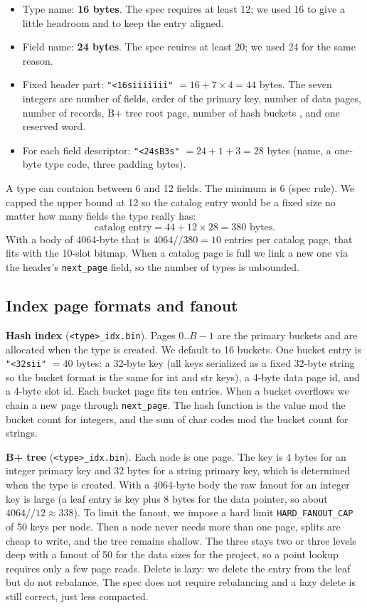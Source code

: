 \documentclass[12pt]{article}
\begin{document}
\begin{itemize}[noitemsep]
  \item Type name: \textbf{16 bytes}. The spec requires at least 12; we
        used 16 to give a little headroom and to keep the entry aligned.
  \item Field name: \textbf{24 bytes}. The spec reuires at least 20; we
        used 24 for the same reason.
  \item Fixed header part: \texttt{"<16siiiiiii"} $= 16 + 7\times4 = 44$
        bytes. The seven integers are number of fields, order of the primary key,
        number of data pages, number of records, B+ tree root page, number of hash buckets
        , and one reserved word.
  \item For each field descriptor: \texttt{"<24sB3s"} $= 24 + 1 + 3 = 28$
        bytes (name, a one-byte type code, three padding bytes).
\end{itemize}

A type can contaion between 6 and 12 fields. The minimum is 6 (spec
rule). We capped the upper bound at 12 so the catalog entry would be a fixed
size no matter how many fields the type really has:
\[
\text{catalog entry} = 44 + 12 \times 28 = 380 \text{ bytes}.
\]
With a body of 4064-byte that is  $4064 // 380 = 10$ entries per catalog page,
that fits with the 10-slot bitmap. When a catalog page is full we
link a new one via the header's \texttt{next\_page} field, so the
number of types is unbounded.

\subsection{Index page formats and fanout}

\textbf{Hash index} (\texttt{<type>\_idx.bin}). Pages $0..B-1$ are the
primary buckets and are allocated when the type is created. We default to 16
buckets. One bucket entry is \texttt{"<32sii"} $= 40$ bytes: a 32-byte key
(all keys serialized as a fixed 32-byte string so the bucket format is
the same for int and str keys), a 4-byte data page id, and a 4-byte slot
id. Each bucket page fits ten entries. When a bucket overflows we chain a new
page through \texttt{next\_page}. The hash function is the value mod the bucket
count for integers, and the sum of char codes mod the bucket count for
strings.

\textbf{B+ tree} (\texttt{<type>\_idx.bin}). Each node is one page. The key
is 4 bytes for an integer primary key and 32 bytes for a string primary
key, which is determined when the type is created. With a 4064-byte body the raw
fanout for an integer key is large (a leaf entry is key plus 8 bytes for
the data pointer, so about $4064 // 12 \approx 338$). To limit the fanout, we impose a hard limit
 \texttt{HARD\_FANOUT\_CAP} of 50 keys per node. Then a node never
needs more than one page, splits are cheap to write, and the tree
remains shallow. The three stays two or three levels deep with a fanout 
of 50 for the data sizes for the project, so a point lookup requires only  a few page reads.
Delete is lazy: we delete the entry from the leaf but do not rebalance. The
spec does not require rebalancing and a lazy delete is still correct, just
less compacted.
\end{document}
